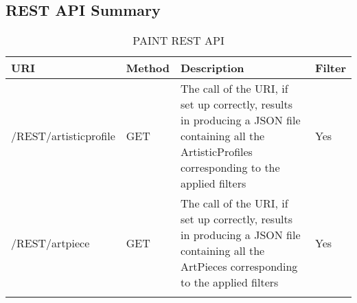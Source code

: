 \subsection{REST API Summary}


\begin{longtable}{|p{}|p{} |p{}|p{}|} 
\hline
\textbf{URI} & \textbf{Method} & \textbf{Description} & \textbf{Filter} \\\hline
/REST/artisticprofile & GET &  The call of the URI, if set up correctly, results in producing a JSON file containing all
the ArtisticProfiles corresponding to the applied filters & Yes\\\hline
/REST/artpiece & GET &  The call of the URI, if set up correctly, results in producing a JSON file containing all
the ArtPieces corresponding to the applied filters & Yes\\\hline

\caption{PAINT REST API}
\label{tab:termGlossary}
\end{longtable}